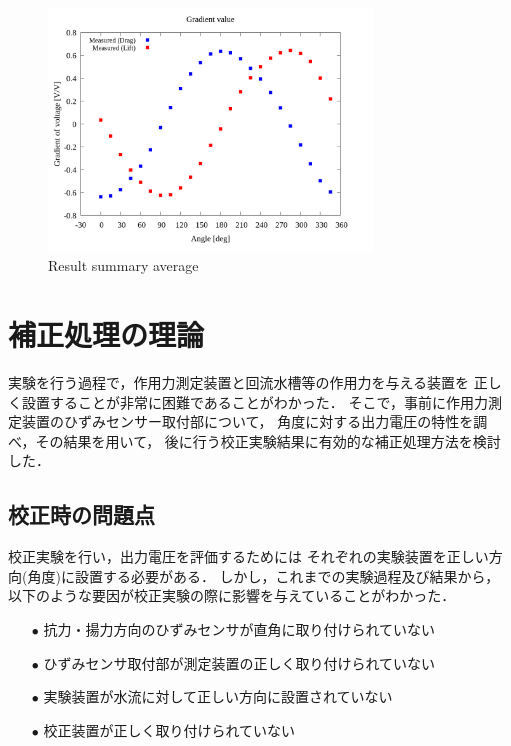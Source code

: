 \documentclass[twocolumn,a4j]{jsarticle}
\begin{document}
\begin{figure}[htbp]
    \footnotesize
    \begin{center}
        \includegraphics[width=86mm]{../graphes/1-ex/05/05_summary-wave.png}
        \caption{Result summary average}
    \end{center}
\end{figure}

\newpage

\section{補正処理の理論}
実験を行う過程で，作用力測定装置と回流水槽等の作用力を与える装置を
正しく設置することが非常に困難であることがわかった．
そこで，事前に作用力測定装置のひずみセンサー取付部について，
角度に対する出力電圧の特性を調べ，その結果を用いて，
後に行う校正実験結果に有効的な補正処理方法を検討した．\\

\subsection{校正時の問題点}
校正実験を行い，出力電圧を評価するためには
それぞれの実験装置を正しい方向(角度)に設置する必要がある．
しかし，これまでの実験過程及び結果から，
以下のような要因が校正実験の際に影響を与えていることがわかった．

\begin{itemize}
    \item [$\bullet$] 抗力・揚力方向のひずみセンサが直角に取り付けられていない
    \item [$\bullet$] ひずみセンサ取付部が測定装置の正しく取り付けられていない
    \item [$\bullet$] 実験装置が水流に対して正しい方向に設置されていない
    \item [$\bullet$] 校正装置が正しく取り付けられていない
\end{itemize}
\end{document}

